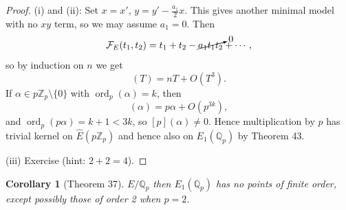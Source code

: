 \documentclass[a4paper]{article}
\newtheorem{corollary}[theorem]{Corollary}
\theoremstyle{definition}
\DeclareMathOperator{\ord}{ord}
\newcommand{\calF}{\mathcal{F}}
\newcommand{\Z}{\mathbb{Z}}
\newcommand{\Q}{\mathbb{Q}}
\begin{document}
\begin{proof}
    (i) and (ii): Set $x=x'$, $y=y'-\frac{a_1}{2}x$. This gives another minimal
    model with no $xy$ term, so we may assume $a_1=0$. Then
    \begin{equation*}
        \calF_E(t_1,t_2) = t_1+t_2 - \cancelto{0}{a_1t_1t_2} + \cdots,
    \end{equation*}
    so by induction on $n$ we get
    \begin{equation*}
        [n](T)=nT + O(T^3).
    \end{equation*}
    If $\alpha\in p\Z_p\setminus\{0\}$ with $\ord_p(\alpha)=k$, then
    \begin{equation*}
        [p](\alpha) = p\alpha + O(p^{3k}),
    \end{equation*}
    and $\ord_p(p\alpha)=k+1<3k$, so $[p](\alpha)\ne0$. Hence multiplication by
    $p$ has trivial kernel on $\hat E(p\Z_p)$ and hence also on $E_1(\Q_p)$ by
    Theorem 43.

    (iii) Exercise (hint: $2+2=4$).
\end{proof}

\begin{corollary}[Theorem 37]
    $E/\Q_p$ then $E_1(\Q_p)$ has no points of finite order, except possibly
    those of order 2 when $p=2$.
\end{corollary}
\end{document}
